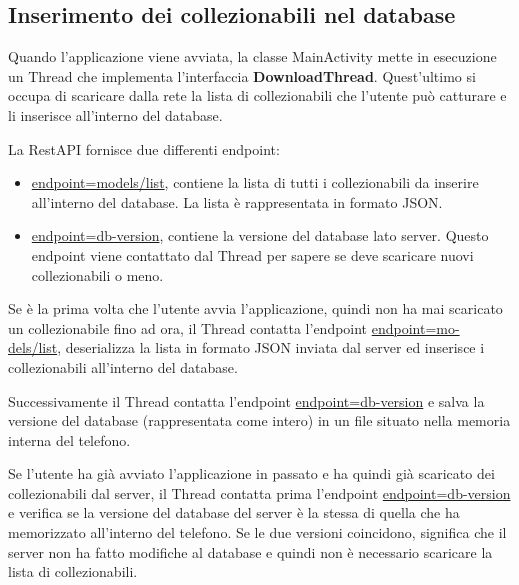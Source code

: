 \documentclass{article}
\begin{document}
\subsection{Inserimento dei collezionabili nel database}

Quando l'applicazione viene avviata, la classe MainActivity mette in esecuzione un Thread che implementa l'interfaccia \textbf{DownloadThread}.
Quest'ultimo si occupa di scaricare dalla rete la lista di collezionabili che l'utente può catturare e li inserisce all'interno del database.

La RestAPI fornisce due differenti endpoint:
\begin{itemize}
    \itemsep 0em 
    \item \href{https://backend.voxel.frangioniwebdev.com/api.php?endpoint=models/list}{endpoint=models/list}, contiene la lista di tutti i collezionabili
    da inserire all'interno del database. La lista è rappresentata in formato JSON.
    \item \href{https://backend.voxel.frangioniwebdev.com/db-version}{endpoint=db-version}, contiene la versione del database lato server. Questo endpoint
    viene contattato dal Thread per sapere se deve scaricare nuovi collezionabili o meno.
\end{itemize}

Se è la prima volta che l'utente avvia l'applicazione, quindi non ha mai scaricato un collezionabile fino ad ora, il Thread contatta l'endpoint
\href{https://backend.voxel.frangioniwebdev.com/api.php?endpoint=models/list}{endpoint=mo-dels/list}, deserializza la lista in formato JSON inviata dal server
ed inserisce i collezionabili all'interno del database. 

Successivamente il Thread contatta l'endpoint \href{https://backend.voxel.frangioniwebdev.com/db-version}{endpoint=db-version}
e salva la versione del database (rappresentata come intero) in un file situato nella memoria interna del telefono.

\medskip

Se l'utente ha già avviato l'applicazione in passato e ha quindi già scaricato dei collezionabili dal server, il Thread contatta prima l'endpoint 
\href{https://backend.voxel.frangioniwebdev.com/db-version}{endpoint=db-version} e verifica se la versione del database del server è la stessa di quella
che ha memorizzato all'interno del telefono. Se le due versioni coincidono, significa che il server non ha fatto modifiche al database e quindi non è
necessario scaricare la lista di collezionabili. 
\end{document}
